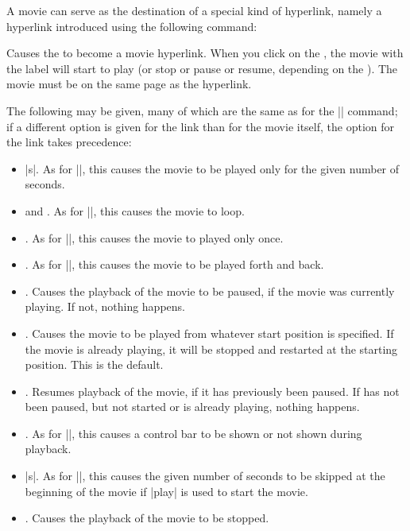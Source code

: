 A movie can serve as the destination of a special kind of hyperlink, namely a hyperlink introduced using the following command:

\begin{command}{\hyperlinkmovie{}}
  Causes the  to become a movie hyperlink. When you click on the , the movie with the label  will start to play (or stop or pause or resume, depending on the ). The movie must be on the same page as the hyperlink.

  The following  may be given, many of which are the same as for the |\movie| command; if a different option is given for the link than for the movie itself, the option for the link takes precedence:
  \begin{itemize}
  \item
    |s|. As for |\movie|, this causes the movie to be played only for the given number of seconds.
  \item
     and .  As for |\movie|, this causes the movie to loop.
  \item
    .  As for |\movie|, this causes the movie to played only once.
  \item
    .  As for |\movie|, this causes the movie to be played forth and back.
  \item
    . Causes the playback of the movie to be paused, if the movie was currently playing. If not, nothing happens.
  \item
    . Causes the movie to be played from whatever start position is specified. If the movie is already playing, it will be stopped and restarted at the starting position. This is the default.
  \item
    . Resumes playback of the movie, if it has previously been paused. If has not been paused, but not started or is already playing, nothing happens.
  \item
    . As for |\movie|, this causes a control bar to be shown or not shown during playback.
  \item
    |s|. As for |\movie|, this causes the given number of seconds to be skipped at the beginning of the movie if |play| is used to start the movie.
  \item
    . Causes the playback of the movie to be stopped.
  \end{itemize}
\end{command}

